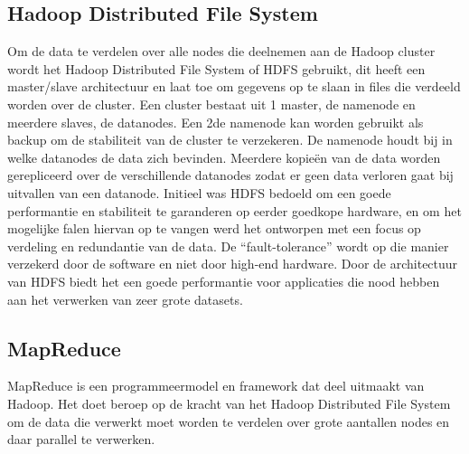 \subsection{Hadoop Distributed File System}
Om de data te verdelen over alle nodes die deelnemen aan de Hadoop cluster wordt het Hadoop Distributed File System of HDFS gebruikt, dit heeft een \newline master/slave architectuur en laat toe om gegevens op te slaan in files die verdeeld worden over de cluster. Een cluster bestaat uit 1 master, de namenode en meerdere slaves, de datanodes. Een 2de namenode kan worden gebruikt als backup om de stabiliteit van de cluster te verzekeren.
\newline
De namenode houdt bij in welke datanodes de data zich bevinden. Meerdere kopieën van de data worden gerepliceerd over de verschillende datanodes zodat er geen data verloren gaat bij uitvallen van een datanode.
\newline
\newline
Initieel was HDFS bedoeld om een goede performantie en stabiliteit te garanderen op eerder goedkope hardware, en om het mogelijke falen hiervan op te vangen werd het ontworpen met een focus op verdeling en redundantie van de data. De ``fault-tolerance'' wordt op die manier verzekerd door de software en niet door high-end hardware.
Door de architectuur van HDFS biedt het een goede performantie voor applicaties die nood hebben aan het verwerken van zeer grote datasets.\autocite{Borthakur2007a}
\newline
\newline
\subsection{MapReduce}
MapReduce is een programmeermodel en framework dat deel uitmaakt van Hadoop. Het doet beroep op de kracht van het Hadoop Distributed File System om de data die verwerkt moet worden te verdelen over grote aantallen nodes en daar parallel te verwerken.\autocite{Talend2023}


